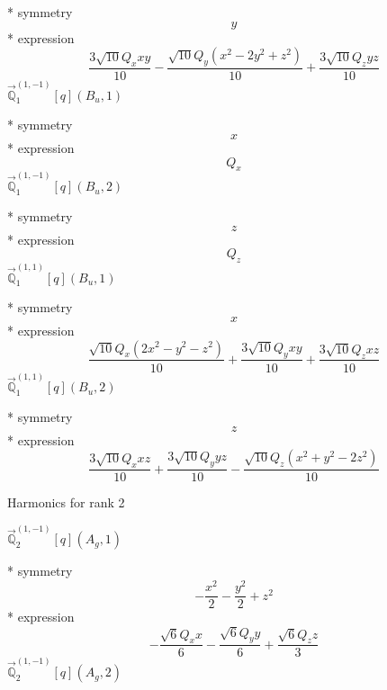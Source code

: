 \documentclass[fleqn,8pt]{jsarticle}
\begin{document}
\noindent\quad ** symmetry
\begin{dmath*}
y
\end{dmath*}
\noindent\quad ** expression
\begin{dmath*}
\frac{3 \sqrt{10} Q_{x} x y}{10} - \frac{\sqrt{10} Q_{y} \left(x^{2} - 2 y^{2} + z^{2}\right)}{10} + \frac{3 \sqrt{10} Q_{z} y z}{10}
\end{dmath*}
\noindent\quad $\vec{\mathbb{Q}}_{1}^{(1,-1)}[q](B_{u},1)$

\noindent\quad ** symmetry
\begin{dmath*}
x
\end{dmath*}
\noindent\quad ** expression
\begin{dmath*}
Q_{x}
\end{dmath*}
\noindent\quad $\vec{\mathbb{Q}}_{1}^{(1,-1)}[q](B_{u},2)$

\noindent\quad ** symmetry
\begin{dmath*}
z
\end{dmath*}
\noindent\quad ** expression
\begin{dmath*}
Q_{z}
\end{dmath*}
\noindent\quad $\vec{\mathbb{Q}}_{1}^{(1,1)}[q](B_{u},1)$

\noindent\quad ** symmetry
\begin{dmath*}
x
\end{dmath*}
\noindent\quad ** expression
\begin{dmath*}
\frac{\sqrt{10} Q_{x} \left(2 x^{2} - y^{2} - z^{2}\right)}{10} + \frac{3 \sqrt{10} Q_{y} x y}{10} + \frac{3 \sqrt{10} Q_{z} x z}{10}
\end{dmath*}
\noindent\quad $\vec{\mathbb{Q}}_{1}^{(1,1)}[q](B_{u},2)$

\noindent\quad ** symmetry
\begin{dmath*}
z
\end{dmath*}
\noindent\quad ** expression
\begin{dmath*}
\frac{3 \sqrt{10} Q_{x} x z}{10} + \frac{3 \sqrt{10} Q_{y} y z}{10} - \frac{\sqrt{10} Q_{z} \left(x^{2} + y^{2} - 2 z^{2}\right)}{10}
\end{dmath*}

\noindent * Harmonics for rank 2

\noindent\quad $\vec{\mathbb{Q}}_{2}^{(1,-1)}[q](A_{g},1)$

\noindent\quad ** symmetry
\begin{dmath*}
- \frac{x^{2}}{2} - \frac{y^{2}}{2} + z^{2}
\end{dmath*}
\noindent\quad ** expression
\begin{dmath*}
- \frac{\sqrt{6} Q_{x} x}{6} - \frac{\sqrt{6} Q_{y} y}{6} + \frac{\sqrt{6} Q_{z} z}{3}
\end{dmath*}
\noindent\quad $\vec{\mathbb{Q}}_{2}^{(1,-1)}[q](A_{g},2)$
\end{document}
